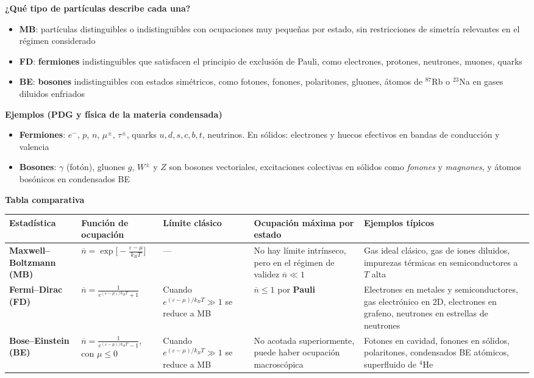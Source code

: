 \documentclass{article}
\begin{document}
\medskip

\noindent\textcolor{Cerulean}{\textbf{¿Qué tipo de partículas describe cada una?}}
\begin{itemize}
  \item \textbf{MB}: partículas distinguibles o indistinguibles con ocupaciones muy pequeñas por estado, sin restricciones de simetría relevantes en el régimen considerado
  \item \textbf{FD}: \textbf{fermiones} indistinguibles que satisfacen el principio de exclusión de Pauli, como electrones, protones, neutrones, muones, quarks
  \item \textbf{BE}: \textbf{bosones} indistinguibles con estados simétricos, como fotones, fonones, polaritones, gluones, átomos de $^{87}$Rb o $^{23}$Na en gases diluidos enfriados
\end{itemize}

\medskip

\noindent\textcolor{Cerulean}{\textbf{Ejemplos (PDG y física de la materia condensada)}}
\begin{itemize}
  \item \textbf{Fermiones}: $e^{-}$, $p$, $n$, $\mu^{\pm}$, $\tau^{\pm}$, quarks $u,d,s,c,b,t$, neutrinos. En sólidos: electrones y huecos efectivos en bandas de conducción y valencia
  \item \textbf{Bosones}: $\gamma$ (fotón), gluones $g$, $W^{\pm}$ y $Z$ son bosones vectoriales, excitaciones colectivas en sólidos como \textit{fonones} y \textit{magnones}, y átomos bosónicos en condensados BE
\end{itemize}

\medskip

\noindent\textcolor{Cerulean}{\textbf{Tabla comparativa}} \\
\renewcommand{\arraystretch}{1.35}
\begin{tabular}{|p{3.1cm}|p{4.2cm}|p{3.2cm}|p{3.2cm}|p{4.6cm}|}
\hline
\centering Estadística & \centering Función de ocupación & \centering Límite clásico & \centering Ocupación máxima por estado & \centering Ejemplos típicos \tabularnewline
\hline
\textbf{Maxwell--Boltzmann (MB)} &
$\displaystyle \overline{n}=\exp\!\Big[-\frac{\varepsilon-\mu}{k_BT}\Big]$ &
--- &
No hay límite intrínseco, pero en el régimen de validez $\overline{n}\ll 1$ &
Gas ideal clásico, gas de iones diluidos, impurezas térmicas en semiconductores a $T$ alta \tabularnewline
\hline
\textbf{Fermi--Dirac (FD)} &
$\displaystyle \overline{n}=\frac{1}{e^{(\varepsilon-\mu)/k_BT}+1}$ &
Cuando $e^{(\varepsilon-\mu)/k_BT}\gg 1$ se reduce a MB &
$\overline{n}\le 1$ por \textcolor{Cerulean}{\textbf{Pauli}} &
Electrones en metales y semiconductores, gas electrónico en 2D, electrones en grafeno, neutrones en estrellas de neutrones \tabularnewline
\hline
\textbf{Bose--Einstein (BE)} &
$\displaystyle \overline{n}=\frac{1}{e^{(\varepsilon-\mu)/k_BT}-1}$, con $\mu\le 0$ &
Cuando $e^{(\varepsilon-\mu)/k_BT}\gg 1$ se reduce a MB &
No acotada superiormente, puede haber ocupación macroscópica &
Fotones en cavidad, fonones en sólidos, polaritones, condensados BE atómicos, superfluido de $^4$He \tabularnewline
\hline
\end{tabular}
\end{document}
